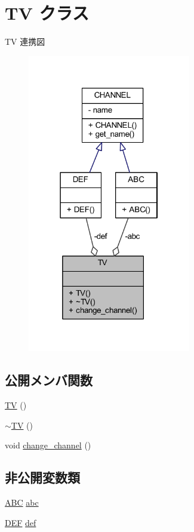 \hypertarget{class_t_v}{}\section{TV クラス}
\label{class_t_v}


TV 連携図\nopagebreak
\begin{figure}[H]
\begin{center}
\leavevmode
\includegraphics[width=202pt]{class_t_v__coll__graph}
\end{center}
\end{figure}
\subsection*{公開メンバ関数}
\begin{DoxyCompactItemize}
\item 
\hyperlink{class_t_v_a02a3fb40f0a254fef0b4aacb6362b563}{TV} ()
\item 
\hyperlink{class_t_v_a377383017c486aa83467f7ad977e3653}{$\sim$\+TV} ()
\item 
void \hyperlink{class_t_v_a26370b5928a57c9af9ed35f9c8f34ba4}{change\+\_\+channel} ()
\end{DoxyCompactItemize}
\subsection*{非公開変数類}
\begin{DoxyCompactItemize}
\item 
\hyperlink{class_a_b_c}{A\+BC} \hyperlink{class_t_v_a7bb8008571c1ca7539e937252503889b}{abc}
\item 
\hyperlink{class_d_e_f}{D\+EF} \hyperlink{class_t_v_ab5e13d7d33ed800b78ddb755b11b7fa2}{def}
\end{DoxyCompactItemize}


